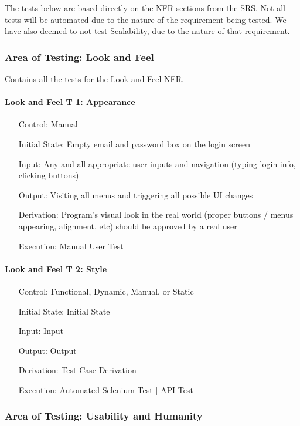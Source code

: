 \documentclass[12pt, titlepage]{article}
\begin{document}
The tests below are based directly on the NFR sections from the SRS. Not all tests will be automated due to the nature of the requirement being tested.
We have also deemed to not test Scalability, due to the nature of that requirement.

\subsubsection{Area of Testing: Look and Feel}

Contains all the tests for the Look and Feel NFR.

\paragraph*{Look and Feel T 1: Appearance}
\begin{itemize}
	\item[Control:] Manual
	\item[Initial State:] Empty email and password box on the login screen
	\item[Input:] Any and all appropriate user inputs and navigation (typing login info, clicking buttons)
	\item[Output:] Visiting all menus and triggering all possible UI changes
	\item[Derivation:] Program's visual look in the real world (proper buttons / menus appearing, alignment, etc) should be approved by a real user
	\item[Execution:] Manual User Test
\end{itemize}

\paragraph*{Look and Feel T 2: Style}
\begin{itemize}
	\item[Control:] Functional, Dynamic, Manual, or Static
	\item[Initial State:] Initial State
	\item[Input:] Input
	\item[Output:] Output
	\item[Derivation:] Test Case Derivation
	\item[Execution:] Automated Selenium Test | API Test
\end{itemize}

\subsubsection{Area of Testing: Usability and Humanity}
\end{document}
